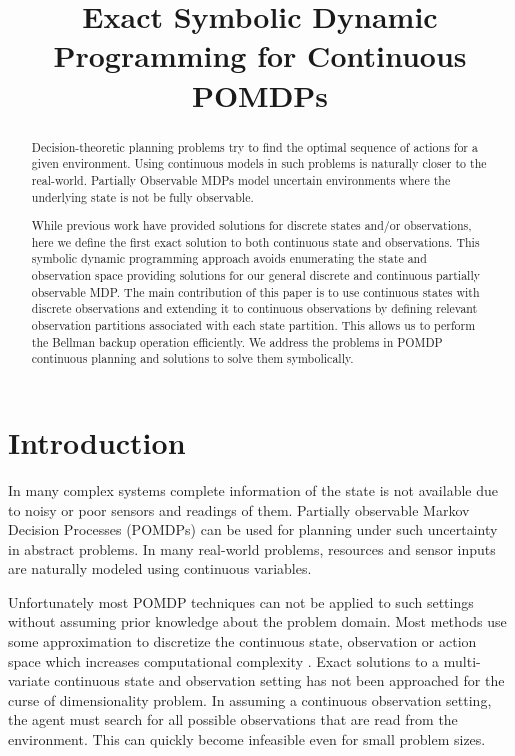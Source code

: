 \documentclass{article} %
\title{Exact Symbolic Dynamic Programming for Continuous POMDPs}
\author{
}
\begin{document}
\maketitle

\begin{abstract}
Decision-theoretic planning problems try to find the optimal sequence of actions for a given environment. Using continuous models in such problems is naturally closer to the real-world. Partially Observable MDPs model uncertain environments where the underlying state is not be fully observable. 

While previous work have provided solutions for discrete states and/or observations, here we define the first exact solution to both continuous state and observations. This symbolic dynamic programming approach avoids enumerating the state and observation space providing solutions for our general discrete and continuous partially observable MDP. The main contribution of this paper is to use continuous states with discrete observations and extending it to continuous observations by defining relevant observation partitions associated with each state partition. This allows us to perform the Bellman backup operation efficiently. We address the problems in POMDP continuous planning and solutions to solve them symbolically. %
\end{abstract}

\section{Introduction}
In many complex systems complete information of the state is not available due to noisy or poor sensors and readings of them. Partially observable Markov Decision Processes (POMDPs)\cite{POMDPfirst} can be used for planning under such uncertainty in abstract problems. In many real-world problems, resources and sensor inputs are naturally modeled using continuous variables. 

Unfortunately most POMDP techniques can not be applied to such settings without assuming prior knowledge about the problem domain. Most methods use some approximation to discretize the continuous state, observation or action space which increases computational complexity \cite{Thrun99h}. Exact solutions to a multi-variate continuous state and observation setting has not been approached for the curse of dimensionality problem. In assuming a continuous observation setting, the agent must search for all possible observations that are read from the environment. This can quickly become infeasible even for small problem sizes. 
\end{document}
